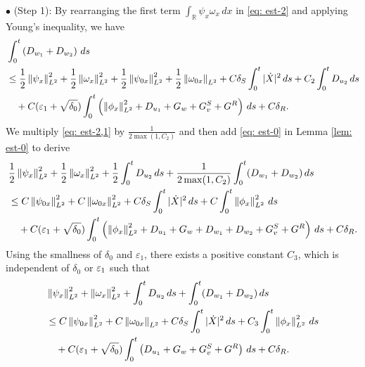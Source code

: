 \documentclass[11pt,reqno]{amsart}
\begin{document}
\noindent $\bullet$ (Step 1): By rearranging the first term $\int_\mathbb{R} \psi_x \omega_x \, dx$ in \eqref{eq: est-2} and applying Young's inequality, we have
\begin{equation} \label{eq: est-2,1}
\begin{aligned}
	&\int_{0}^t \left( D_{w_1} + D_{w_2} \right) \, ds 
	\\
	&\le \frac{1}{2} \left\lVert\psi_x\right\rVert_{L^2}^2+\frac12 \left\lVert\omega_x\right\rVert_{L^2}^2  + \frac12 \left\lVert\psi_{0x}\right\rVert_{L^2}^2+\frac12\left\lVert\omega_{0x}\right\rVert_{L^2} +C \delta_S \int_0^t |\dot{X}|^2 \, d s + C_2 \int_{0}^{t} D_{u_2} \, ds \\ 
	&\quad  +  C(\varepsilon_1+\sqrt{\delta_0}) \int_0^t \left( \left\lVert\phi_x\right\rVert_{L^2}^2+D_{u_1}+G_w +G^S_v+G^R\right) \, d s+C \delta_R.
\end{aligned}
\end{equation}
We multiply \eqref{eq: est-2,1} by $\frac{1}{2 \max(1,C_2)}$ and then add \eqref{eq: est-0} in Lemma \ref{lem: est-0} to derive
\begin{equation*} 
\begin{aligned}
	&\frac{1}{2} \left\lVert\psi_x\right\rVert_{L^2}^2+\frac12 \left\lVert\omega_x\right\rVert_{L^2}^2 +  \frac{1}{2} \int_0^t D_{u_2} \, d s + \frac{1}{2 \max(1,C_2)} \int_{0}^t  (D_{w_1}+D_{w_2}) \, ds  \\
	&\le C \left\lVert\psi_{0x}\right\rVert_{L^2}^2+C \left\lVert\omega_{0x}\right\rVert_{L^2}^2   +C\delta_S \int_0^t |\dot{X}|^2 \, d s + C \int_0^t \left\lVert\phi_x\right\rVert_{L^2}^2 \, d s \\ 
	& \quad +C (\varepsilon_1+\sqrt{\delta_0}) \int_0^t  \left( \left\lVert\phi_x\right\rVert_{L^2}^2+ D_{u_1} + G_w+D_{w_1}+D_{w_2} +G^S_v+G^R \right) \, d s +C \delta_R.\\  
\end{aligned}
\end{equation*} 
Using the smallness of $\delta_0$ and $\varepsilon_1$, there exists a positive constant $C_3$, which is independent of $\delta_0$ or $\varepsilon_1$ such that
\begin{equation} \label{eq: est-3}
\begin{aligned}
	&\left\lVert \psi_x \right\rVert_{L^2}^2+\left\lVert \omega_x \right\rVert_{L^2}^2+  \int_0^t D_{u_2} \, d s + \int_{0}^t  (D_{w_1}+D_{w_2}) \, ds  \\
	&\le C \left\lVert\psi_{0x}\right\rVert_{L^2}^2+C\left\lVert\omega_{0x}\right\rVert_{L^2}  +C\delta_S \int_0^t |\dot{X}|^2 \, d s + C_3 \int_0^t \left\lVert\phi_x\right\rVert_{L^2}^2 \, d s \\
	&\quad +
 C(\varepsilon_1+\sqrt{\delta_0}) \int_0^t \left( D_{u_1}+G_w +G^S_v+G^R\right) \, d s+C \delta_R.\\  
\end{aligned}
\end{equation} 
	
\end{document}
